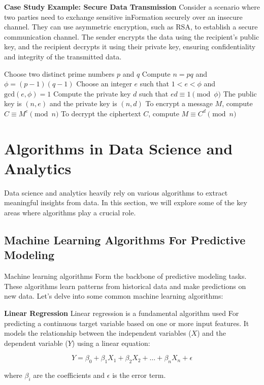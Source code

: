 \documentclass[12pt]{book} %
\begin{document}
\textbf{Case Study Example: Secure Data Transmission}
Consider a scenario where two parties need to exchange sensitive inFormation securely over an insecure channel. They can use asymmetric encryption, such as RSA, to establish a secure communication channel. The sender encrypts the data using the recipient's public key, and the recipient decrypts it using their private key, ensuring confidentiality and integrity of the transmitted data.
\FloatBarrier
\begin{algorithmic}[1]
\State Choose two distinct prime numbers $p$ and $q$
\State Compute $n = pq$ and $\phi = (p-1)(q-1)$
\State Choose an integer $e$ such that $1 < e < \phi$ and $\text{gcd}(e,\phi) = 1$
\State Compute the private key $d$ such that $ed \equiv 1 \pmod{\phi}$
\State The public key is $(n, e)$ and the private key is $(n, d)$
\State To encrypt a message $M$, compute $C \equiv M^e \pmod{n}$
\State To decrypt the ciphertext $C$, compute $M \equiv C^d \pmod{n}$
\end{algorithmic}


\section{Algorithms in Data Science and Analytics}

Data science and analytics heavily rely on various algorithms to extract meaningful insights from data. In this section, we will explore some of the key areas where algorithms play a crucial role.

\subsection{Machine Learning Algorithms For Predictive Modeling}

Machine learning algorithms Form the backbone of predictive modeling tasks. These algorithms learn patterns from historical data and make predictions on new data. Let's delve into some common machine learning algorithms:

\textbf{Linear Regression}
Linear regression is a fundamental algorithm used For predicting a continuous target variable based on one or more input features. It models the relationship between the independent variables ($X$) and the dependent variable ($Y$) using a linear equation:

\[
Y = \beta_0 + \beta_1X_1 + \beta_2X_2 + \ldots + \beta_nX_n + \epsilon
\]

where $\beta_i$ are the coefficients and $\epsilon$ is the error term.
\end{document}
